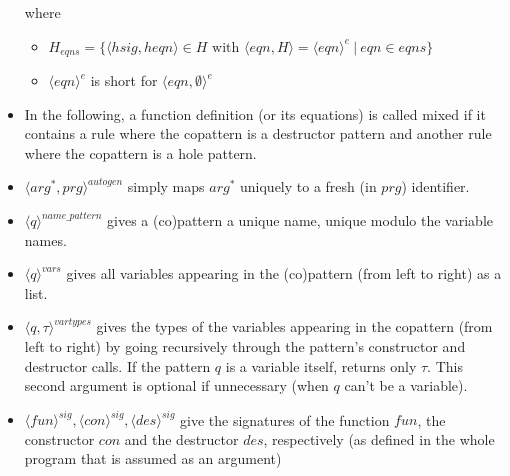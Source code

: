 \documentclass[11pt]{article} %
\begin{document}
\begin{itemize}
where
\begin{itemize}
\item $H_{eqns} = \{ \big\langle hsig, heqn \big\rangle \in H \textrm{ with } \big\langle eqn, H \big\rangle = \langle eqn \rangle^{e} ~ | ~ eqn \in eqns \}$

\item $\langle eqn \rangle^{e}$ is short for $\langle eqn, \emptyset \rangle^{e}$
\end{itemize}

\item In the following, a function definition (or its equations) is called mixed if it contains a rule where the copattern is a destructor pattern and another rule where the copattern is a hole pattern.

\item $\langle arg^*, prg \rangle^{autogen}$ simply maps $arg^*$ uniquely to a fresh (in $prg$) identifier.

\item $\langle q \rangle^{name\_pattern}$ gives a (co)pattern a unique name, unique modulo the variable names.

\item $\langle q \rangle^{vars}$ gives all variables appearing in the (co)pattern (from left to right) as a list.

\item $\langle q, \tau \rangle^{vartypes}$ gives the types of the variables appearing in the copattern (from left to right) by going recursively through the pattern's constructor and destructor calls. If the pattern $q$ is a variable itself, returns only $\tau$. This second argument is optional if unnecessary (when $q$ can't be a variable).

\item $\langle fun \rangle^{sig}, \langle con \rangle^{sig}, \langle des \rangle^{sig}$ give the signatures of the function $fun$, the constructor $con$ and the destructor $des$, respectively (as defined in the whole program that is assumed as an argument)


\end{itemize}
\end{document}
